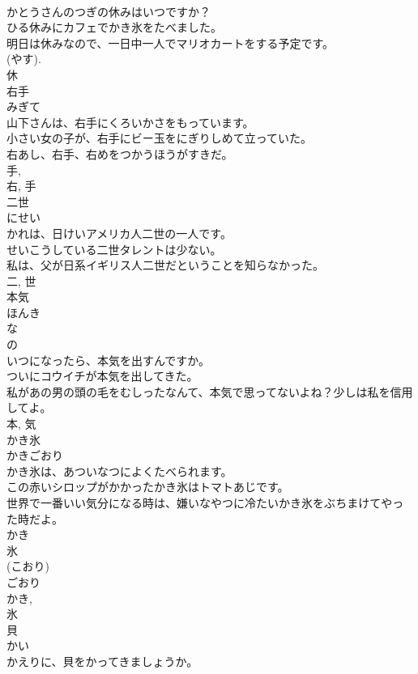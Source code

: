 \documentclass[8pt]{extreport}
\begin{document}
\begin{CJK}{UTF8}{min}
\\	かとうさんのつぎの休みはいつですか？	
\\	ひる休みにカフェでかき氷をたべました。	
\\	明日は休みなので、一日中一人でマリオカートをする予定です。	
\\	(やす).
\\	休	
\\	右手	
\\	みぎて	
\\	山下さんは、右手にくろいかさをもっています。	
\\	小さい女の子が、右手にビー玉をにぎりしめて立っていた。	
\\	右あし、右手、右めをつかうほうがすきだ。	
\\	手, 
\\	右, 手	
\\	二世	
\\	にせい	
\\	かれは、日けいアメリカ人二世の一人です。	
\\	せいこうしている二世タレントは少ない。	
\\	私は、父が日系イギリス人二世だということを知らなかった。	
\\	二, 世	
\\	本気	
\\	ほんき	
\\	な 
\\	の 
\\	いつになったら、本気を出すんですか。	
\\	ついにコウイチが本気を出してきた。	
\\	私があの男の頭の毛をむしったなんて、本気で思ってないよね？少しは私を信用してよ。	
\\	本, 気	
\\	かき氷	
\\	かきごおり	
\\	かき氷は、あついなつによくたべられます。	
\\	この赤いシロップがかかったかき氷はトマトあじです。	
\\	世界で一番いい気分になる時は、嫌いなやつに冷たいかき氷をぶちまけてやった時だよ。	
\\	かき 
\\	氷 
\\	(こおり) 
\\	ごおり 
\\	かき, 
\\	氷	
\\	貝	
\\	かい	
\\	かえりに、貝をかってきましょうか。	

\end{CJK}
\end{document}
